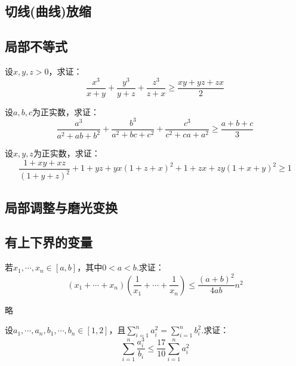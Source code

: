 \documentclass[cn,hazy,black,10pt,normal]{elegantnote}
\newcommand{\ssb}[1]{\left( #1 \right)}
\begin{document}
\subsection{切线(曲线)放缩}

\subsection{局部不等式}

\begin{problem} %
	设$x,y,z>0$，求证：$$\frac{x^3}{x+y} + \frac{y^3}{y+z} + \frac{z^3}{z+x} \geq \frac{xy+yz+zx}{2}$$
\end{problem}
\begin{solution}
\end{solution}

\begin{problem} %
	设$a,b,c$为正实数，求证：$$\frac{a^3}{a^2+ab+b^2} + \frac{b^3}{a^2+bc+c^2} + \frac{c^3}{c^2+ca+a^2} \geq \frac{a+b+c}{3}$$
\end{problem}
\begin{solution}
\end{solution}

\begin{problem} %
	设$x,y,z$为正实数，求证：$$\frac{1+xy+xz}{(1+y+z)^2} + {1+yz+yx}{(1+z+x)^2} + {1+zx+zy}{(1+x+y)^2} \geq 1$$
\end{problem}

\subsection{局部调整与磨光变换}

\subsection{有上下界的变量}

\begin{problem} %
	若$x_1,\cdots ,x_n \in [a,b]$，其中$0<a<b$.求证：$$(x_1+ \cdots + x_n)\ssb{\frac{1}{x_1} + \cdots + \frac{1}{x_n}} \leq \frac{(a+b)^2}{4ab}n^2$$
\end{problem}
\begin{solution}
	略
\end{solution}

\begin{problem} %
	设$a_1, \cdots ,a_n , b_1 ,\cdots ,b_n \in [1,2]$，且$\sum_{i=1}^{n} a_i^2 = \sum_{i=1}^{n} b_i^2$.求证：$$\sum_{i=1}^{n} \frac{a_i^3}{b_i} \leq \frac{17}{10}\sum_{i=1}^{n} a_i^2$$
\end{problem}
\begin{solution}
\end{solution}
\end{document}
